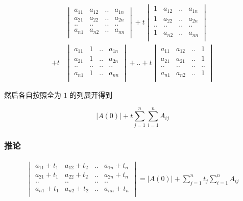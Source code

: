 \documentclass[12pt,a4paper]{ctexart}
\begin{document}
\begin{align*}
&\begin{vmatrix}
        a_{11}  & a_{12} & .. & a_{1n}  \\
        a_{21}  & a_{22}  & .. & a_{2n} \\
        .. & .. & .. & .. \\
        a_{n1} & a_{n2} & .. & a_{nn}  \\
\end{vmatrix} + t\begin{vmatrix}
        1  & a_{12}  & .. & a_{1n}  \\
        1  & a_{22}  & .. & a_{2n}  \\
        .. & .. & .. & .. \\
        1 & a_{n2}  & .. & a_{nn}  \\
    \end{vmatrix} \\ + t & \begin{vmatrix}
        a_{11}  & 1  & .. & a_{1n}  \\
        a_{21}  & 1  & .. & a_{2n}  \\
        .. & .. & .. & .. \\
        a_{n1} & 1 & .. & a_{nn}  \\
    \end{vmatrix} + .. + t\begin{vmatrix}
        a_{11}  & a_{12}  & .. & 1 \\
        a_{21}  & a_{21}  & .. & 1 \\
        .. & .. & .. & .. \\
        a_{n1} & a_{n2} & .. & 1 \\
    \end{vmatrix}
\end{align*}

然后各自按照全为 $1$ 的列展开得到

\[
\lvert A(0) \rvert + t\sum_{j=1}^{n}\sum_{i=1}^{n}A_{ij}
\]

\subsubsection{推论}

\begin{align*}
 \begin{vmatrix}
        a_{11} + t_1 & a_{12} + t_2 & .. & a_{1n} + t_n \\
        a_{21} + t_1 & a_{22} + t_2 & .. & a_{2n} + t_n \\
        .. & .. & .. & .. \\
        a_{n1} + t_1 & a_{n2} + t_2 & .. & a_{nn} + t_n \\
\end{vmatrix}  = \lvert A(0) \rvert  + \sum_{j=1}^{n}t_j \sum_{i=1}^{n}A_{ij}
\end{align*}
\end{document}
